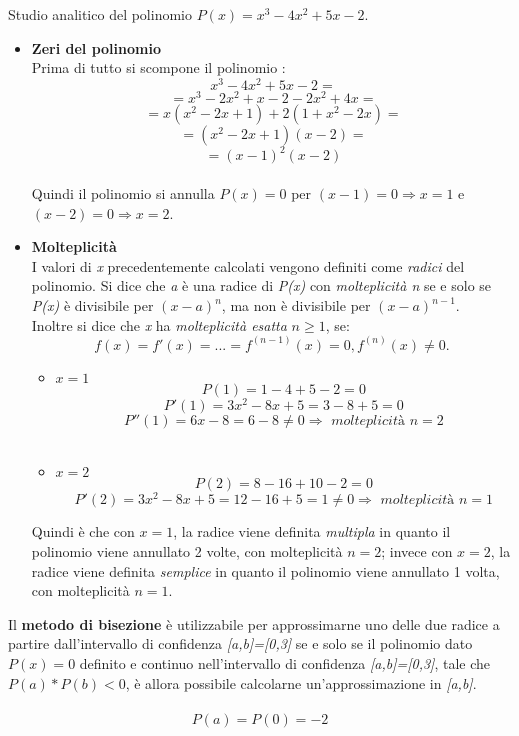 Studio analitico del polinomio $P(x) = x^3-4x^2+5x-2$.\\
\begin{itemize}
\item \textbf{Zeri del polinomio}\\
	Prima di tutto si scompone il polinomio :
	\[
	\ x^3-4x^2+5x-2 =
	\] 
	\[
	\ = x^3-2x^2+x-2-2x^2+4x =
	\]
	\[
	\ = x(x^2-2x+1)+2(1+x^2-2x) =
	\]
	\[
	\ = (x^2-2x+1)(x-2) =
	\]
	\[
	\ = (x-1)^2(x-2) 
	\]\\
	Quindi il polinomio si annulla $P(x)=0$ per $(x-1)=0 \Rightarrow x=1$ e $(x-2)=0 \Rightarrow x=2$. \\
\item \textbf{Molteplicità}\\
	I valori di \textit{x} precedentemente calcolati vengono definiti come \textit{radici} del polinomio. Si dice che \textit{a} è una radice di \textit{P(x)} con \textit{molteplicità n} se e solo se \textit{P(x)} è divisibile per $(x-a)^n$, ma non è divisibile per $(x-a)^{n-1}$.\\
	Inoltre si dice che \textit{x} ha \textit{molteplicità esatta} $n \geq 1$, se:
	\[
	f(x) = f'(x) = ... = f^{(n-1)}(x) = 0,  f^{(n)}(x) \neq 0.
	\]
	\begin{itemize}
	\item $x=1$
		\[
		P(1) = 1-4+5-2 = 0 
		\]
		\[
		P'(1) = 3x^2-8x+5 = 3-8+5 = 0 
		\]
		\[
		P''(1) = 6x-8 = 6-8 \neq 0 \Rightarrow \textit{ molteplicità } n=2
		\]\\
	\item $x=2$
		\[
		P(2) = 8-16+10-2 = 0 
		\]
		\[
		P'(2) = 3x^2-8x+5 = 12-16+5 = 1 \neq 0 \Rightarrow \textit{ molteplicità } n=1
		\]
	\end{itemize}
	Quindi è che con $x=1$, la radice viene definita \textit{multipla} in quanto il polinomio viene annullato 2 volte, con molteplicità $n=2$; invece con $x=2$, la radice viene definita \textit{semplice} in quanto il polinomio viene annullato 1 volta,  con molteplicità $n=1$.\\ 
\end{itemize}
Il \textbf{metodo di bisezione} è utilizzabile per approssimarne uno delle due radice a partire dall'intervallo di confidenza \textit{[a,b]=[0,3]} se e solo se il polinomio dato $P(x)=0$ definito e continuo nell'intervallo di confidenza \textit{[a,b]=[0,3]}, tale che $P(a)*P(b) < 0$, è allora possibile calcolarne un'approssimazione in \textit{[a,b]}.\\\\
\[
P(a) = P(0) = -2
\]
